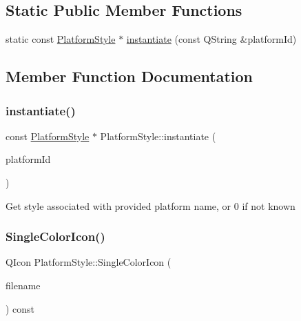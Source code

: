 \subsection*{Static Public Member Functions}
\begin{DoxyCompactItemize}
\item 
static const \mbox{\hyperlink{class_platform_style}{Platform\+Style}} $\ast$ \mbox{\hyperlink{class_platform_style_ab55b9c4d135bfddc4494f6eaac26becf}{instantiate}} (const Q\+String \&platform\+Id)
\end{DoxyCompactItemize}


\subsection{Member Function Documentation}
\mbox{\label{class_platform_style_ab55b9c4d135bfddc4494f6eaac26becf}} 
\subsubsection{\texorpdfstring{instantiate()}{instantiate()}}
{\footnotesize\ttfamily const \mbox{\hyperlink{class_platform_style}{Platform\+Style}} $\ast$ Platform\+Style\+::instantiate (\begin{DoxyParamCaption}\item[{const Q\+String \&}]{platform\+Id }\end{DoxyParamCaption})\hspace{0.3cm}{\ttfamily [static]}}

Get style associated with provided platform name, or 0 if not known \mbox{\label{class_platform_style_a3f4ff8b7a2054cbd4283e67208523035}} 
\subsubsection{\texorpdfstring{Single\+Color\+Icon()}{SingleColorIcon()}\hspace{0.1cm}{\footnotesize\ttfamily [1/2]}}
{\footnotesize\ttfamily Q\+Icon Platform\+Style\+::\+Single\+Color\+Icon (\begin{DoxyParamCaption}\item[{const Q\+String \&}]{filename }\end{DoxyParamCaption}) const}

